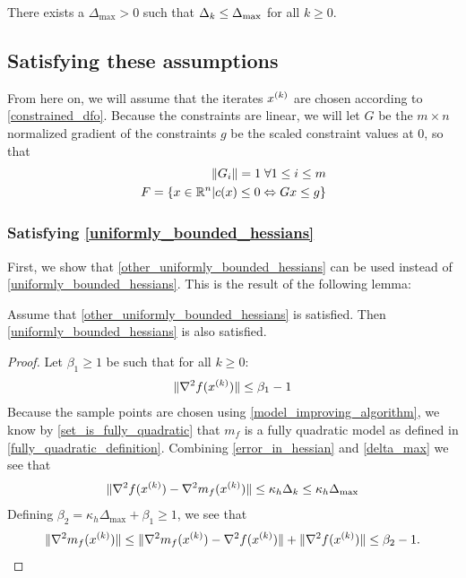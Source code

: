 \color{red}
\begin{lemma}
\label{delta_max}
There exists a $\Delta_{\text{max}} > 0$ such that $\Delta_k \le \Delta_{\text{max}}$ for all $k \ge 0$.
\end{lemma}
\color{black}



\subsection{Satisfying these assumptions}

From here on, we will assume that the iterates ${x^{(k)}}$ are chosen according to \cref{constrained_dfo}.
Because the constraints are linear, we will let $G$ be the $m \times n$ normalized gradient of the constraints $g$ be the scaled constraint values at $0$, so that
\begin{align}
\|G_i\| = 1\;\forall 1\le i\le m \\
{F} = \{x \in \mathbb R^n | c(x) \le 0 \Leftrightarrow G x \le g \} \label{define_g}
\end{align}

\subsubsection{Satisfying \cref{uniformly_bounded_hessians}}
\label{replacing_h3}
First, we show that \cref{other_uniformly_bounded_hessians} can be used instead of \cref{uniformly_bounded_hessians}.
This is the result of the following lemma:

\begin{lemma}
Assume that \cref{other_uniformly_bounded_hessians} is satisfied.
Then \cref{uniformly_bounded_hessians} is also satisfied.
\end{lemma}

\begin{proof}
Let $\beta_1 \ge 1$ be such that for all $k \ge 0$:
\begin{align*}
\|\nabla^2 f({x^{(k)}}) \| \le \beta_1 - 1
\end{align*}
Because the sample points are chosen using \cref{model_improving_algorithm}, we know by \cref{set_is_fully_quadratic} that $m_f$ is a fully quadratic model as defined in \cref{fully_quadratic_definition}.
Combining \cref{error_in_hessian} and \cref{delta_max} we see that
\begin{align*}
\|\nabla^2 f({x^{(k)}}) - \nabla^2 m_f({x^{(k)}}) \| \le \kappa_{h} \Delta_k \le \kappa_{h} \Delta_{\text{max}}
\end{align*}
Defining $\beta_2 = \kappa_{h} \Delta_{\text{max}} + \beta_1 \ge 1$, we see that
\begin{align*}
\|\nabla^2 m_{f}({x^{(k)}}) \| \le \|\nabla^2 m_{f}({x^{(k)}}) - \nabla^2 f({x^{(k)}})  \| + \|\nabla^2 f({x^{(k)}}) \|  \le \beta_2 - 1 .
\end{align*}
\end{proof}

